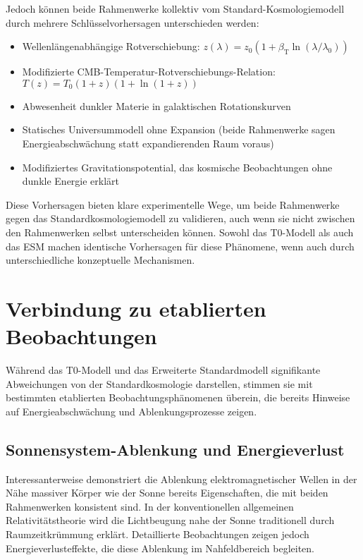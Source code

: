 \documentclass[12pt,a4paper]{article}
\newcommand{\betaT}{\beta_{\text{T}}}
\begin{document}
	Jedoch können beide Rahmenwerke kollektiv vom Standard-Kosmologiemodell durch mehrere Schlüsselvorhersagen unterschieden werden:
	
	\begin{itemize}
		\item Wellenlängenabhängige Rotverschiebung: \(z(\lambda) = z_0 (1 + \betaT \ln(\lambda/\lambda_0))\)
		\item Modifizierte CMB-Temperatur-Rotverschiebungs-Relation: \(T(z) = T_0 (1+z)(1+\ln(1+z))\)
		\item Abwesenheit dunkler Materie in galaktischen Rotationskurven
		\item Statisches Universummodell ohne Expansion (beide Rahmenwerke sagen Energieabschwächung statt expandierenden Raum voraus)
		\item Modifiziertes Gravitationspotential, das kosmische Beobachtungen ohne dunkle Energie erklärt
	\end{itemize}
	
	Diese Vorhersagen bieten klare experimentelle Wege, um beide Rahmenwerke gegen das Standardkosmologiemodell zu validieren, auch wenn sie nicht zwischen den Rahmenwerken selbst unterscheiden können. Sowohl das T0-Modell als auch das ESM machen identische Vorhersagen für diese Phänomene, wenn auch durch unterschiedliche konzeptuelle Mechanismen.
	
	\section{Verbindung zu etablierten Beobachtungen}
	\label{sec:established_observations}
	
	Während das T0-Modell und das Erweiterte Standardmodell signifikante Abweichungen von der Standardkosmologie darstellen, stimmen sie mit bestimmten etablierten Beobachtungsphänomenen überein, die bereits Hinweise auf Energieabschwächung und Ablenkungsprozesse zeigen.
	
	\subsection{Sonnensystem-Ablenkung und Energieverlust}
	\label{subsec:solar_deflection}
	
	Interessanterweise demonstriert die Ablenkung elektromagnetischer Wellen in der Nähe massiver Körper wie der Sonne bereits Eigenschaften, die mit beiden Rahmenwerken konsistent sind. In der konventionellen allgemeinen Relativitätstheorie wird die Lichtbeugung nahe der Sonne traditionell durch Raumzeitkrümmung erklärt. Detaillierte Beobachtungen zeigen jedoch Energieverlusteffekte, die diese Ablenkung im Nahfeldbereich begleiten.
	
\end{document}
